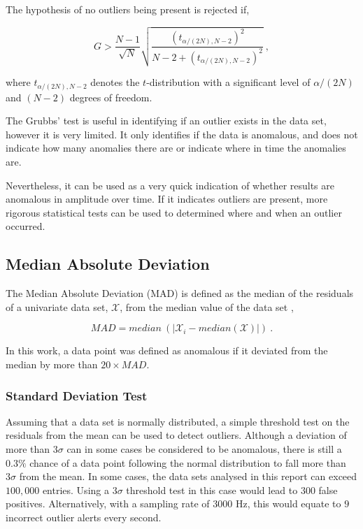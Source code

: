 The hypothesis of no outliers being present is rejected if,

\begin{equation}
    G > \dfrac{N-1}{\sqrt{N}} \sqrt{\dfrac{(t_{\alpha/(2N), N-2})^2}{N-2+(t_{\alpha/(2N), N-2})^2}} ~,
    \label{grubbs_condition}
\end{equation}

where $t_{\alpha/(2N), N-2}$ denotes the $t$-distribution with a significant level of $\alpha/(2N)$ and $(N-2)$ degrees of freedom. 

The Grubbs' test is useful in identifying if an outlier exists in the data set, however it is very limited. It only identifies if the data is anomalous, and does not indicate how many anomalies there are or indicate where in time the anomalies are.

Nevertheless, it can be used as a very quick indication of whether results are anomalous in amplitude over time. If it indicates outliers are present, more rigorous statistical tests can be used to determined where and when an outlier occurred. 

\subsection{Median Absolute Deviation}

The Median Absolute Deviation (MAD) is defined as the median of the residuals of a univariate data set, $\mathcal{X}$, from the median value of the data set \cite{rousseeuw1993alternatives},

\begin{equation}
    MAD = median~(|\mathcal{X}_i - median(\mathcal{X})|)~.
    \label{eq:MAD}
\end{equation}

In this work, a data point was defined as anomalous if it deviated from the median by more than $20 \times MAD$.

\subsubsection{Standard Deviation Test}
Assuming that a data set is normally distributed, a simple threshold test on the residuals from the mean can be used to detect outliers. 
Although a deviation of more than $3\sigma$ can in some cases be considered to be anomalous, there is still a $0.3\%$ chance of a data point following the normal distribution to fall more than $3\sigma$ from the mean. In some cases, the data sets analysed in this report can exceed $100,000$ entries. Using a $3\sigma$ threshold test in this case would lead to $300$ false positives. Alternatively, with a sampling rate of $3000$ Hz, this would equate to $9$ incorrect outlier alerts every second. 

